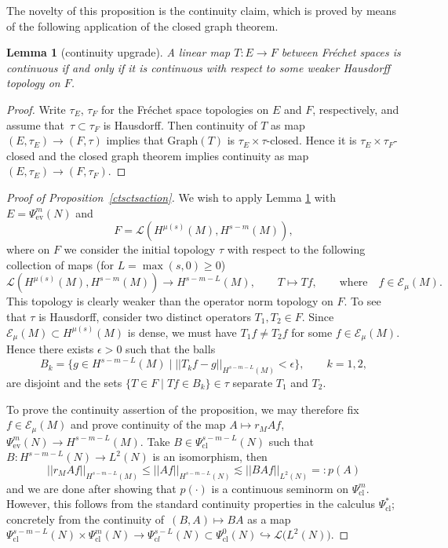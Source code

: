 \documentclass[pdftex]{sigma}
\numberwithin{equation}{section}
\newtheorem{Lemma}[Theorem]{Lemma}
\theoremstyle{definition}
\newcommand{\1}{{\bf 1}}
\begin{document}
The novelty of this proposition is the continuity claim, which is proved by means of the following application of the closed graph theorem.

\begin{Lemma}[continuity upgrade]\label{upgrade}
A linear map $T\colon E\to F$ between Fr{\'e}chet spaces is continuous if and only if it is continuous with respect to some weaker Hausdorff topology on $F$.
\end{Lemma}

\begin{proof}
	Write $\tau_E$, $\tau_F$ for the Fr{\'e}chet space topologies on $E$ and $F$, respectively, and assume that~${\tau\subset \tau_F}$ is Hausdorff. Then continuity of $T$ as map $(E,\tau_E)\to (F,\tau)$ implies that $\mathrm{Graph}(T)$ is $\tau_E\times \tau$-closed. Hence it is $\tau_E\times \tau_F$-closed and the closed graph theorem implies continuity as map $(E,\tau_E)\to (F,\tau_F)$.
\end{proof}


\begin{proof}[Proof of Proposition~\ref{ctsctsaction}]
We wish to apply Lemma \ref{upgrade} with $E=\Psi_\mathrm{ev}^m(N)$ and
\[
F=\mathcal L(H^{\mu(s)}(M),H^{s-m}(M)),
\]
 where on $F$ we consider the initial topology $\tau$ with respect to the following collection of maps (for $L=\max(s,0)\ge 0$)
\[
	\mathcal L(H^{\mu(s)}(M),H^{s-m}(M)) \to H^{s-m-L}(M),\qquad T\mapsto Tf,\qquad \text{where}\quad f\in \mathcal E_\mu(M).\]
This topology is clearly weaker than the operator norm topology on $F$. To see that $\tau$ is Hausdorff, consider two distinct operators $T_1,T_2\in F$. Since $\mathcal E_\mu(M)\subset H^{\mu(s)}(M)$ is dense, we must have $T_1 f \neq T_2 f$ for some $f\in \mathcal E_\mu(M)$. Hence there exists $\epsilon>0$ such that the balls
\[
B_k=\bigl\{g\in H^{s-m-L}(M)\mid ||T_k f - g||_{H^{s-m-L}(M)}<\epsilon\bigr\},\qquad k=1,2,
\]
 are disjoint and the sets $\{T\in F\mid Tf\in B_k\} \in \tau$ separate $T_1$ and $T_2$.

To prove the continuity assertion of the proposition, we may therefore fix $f\in \mathcal E_\mu(M)$ and prove continuity of the map $ A\mapsto r_M Af$, $ \Psi^m_\mathrm{ev}(N) \to H^{s-m-L}(M)$. Take $B\in \Psi_\mathrm{cl}^{s-m-L}(N)$ such that $B\colon H^{s-m-L}(N)\to L^2(N)$ is an isomorphism, then
\[
	||r_MA f||_{H^{s-m-L}(M)}\le ||A f||_{H^{s-m-L}(N)} \lesssim ||BAf||_{L^2(N)}=:p(A)
\]
and we are done after showing that $p(\cdot)$ is a continuous seminorm on $\Psi^m_{\mathrm{cl}}$. However, this follows from the standard continuity properties in the calculus $\Psi_{\mathrm{cl}}^*$; concretely from the continuity of~${(B,A)\mapsto BA}$ as a map $\Psi^{s-m-L}_\mathrm{cl}(N)\times \Psi^{m}_\mathrm{cl}(N) \to \Psi_{\mathrm cl}^{s-L}(N) \subset \Psi^0_{\mathrm{cl}}(N) \hookrightarrow \mathcal L\bigl(L^2(N)\bigr)$.
\end{proof}
\end{document}
